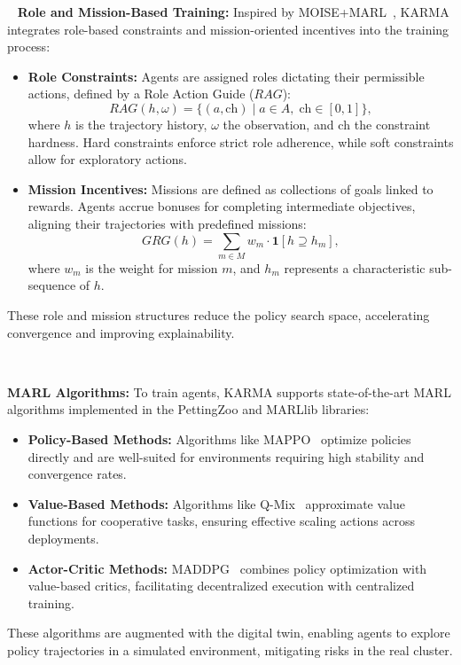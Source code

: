\documentclass[conference]{IEEEtran}
\begin{document}
\
\noindent\textbf{Role and Mission-Based Training:} 
Inspired by MOISE+MARL~\cite{MOISEMARL2025}, KARMA integrates role-based constraints and mission-oriented incentives into the training process:
\begin{itemize}
    \item \textbf{Role Constraints:} Agents are assigned roles dictating their permissible actions, defined by a Role Action Guide ($RAG$):
    \[
    RAG(h, \omega) = \{(a, \text{ch}) \;|\; a \in A, \; \text{ch} \in [0,1]\},
    \]
    where $h$ is the trajectory history, $\omega$ the observation, and $\text{ch}$ the constraint hardness. Hard constraints enforce strict role adherence, while soft constraints allow for exploratory actions.
    \item \textbf{Mission Incentives:} Missions are defined as collections of goals linked to rewards. Agents accrue bonuses for completing intermediate objectives, aligning their trajectories with predefined missions:
    \[
    GRG(h) = \sum_{m \in M} w_m \cdot \mathbf{1}[h \supseteq h_m],
    \]
    where $w_m$ is the weight for mission $m$, and $h_m$ represents a characteristic sub-sequence of $h$.
\end{itemize}
These role and mission structures reduce the policy search space, accelerating convergence and improving explainability.

\

\noindent\textbf{MARL Algorithms:} 
To train agents, KARMA supports state-of-the-art MARL algorithms implemented in the PettingZoo and MARLlib libraries:
\begin{itemize}
    \item \textbf{Policy-Based Methods:} Algorithms like MAPPO~\cite{MAPPO2021} optimize policies directly and are well-suited for environments requiring high stability and convergence rates.
    \item \textbf{Value-Based Methods:} Algorithms like Q-Mix~\cite{QMIX2018} approximate value functions for cooperative tasks, ensuring effective scaling actions across deployments.
    \item \textbf{Actor-Critic Methods:} MADDPG~\cite{MADDPG2017} combines policy optimization with value-based critics, facilitating decentralized execution with centralized training.
\end{itemize}
These algorithms are augmented with the digital twin, enabling agents to explore policy trajectories in a simulated environment, mitigating risks in the real cluster.
\end{document}
